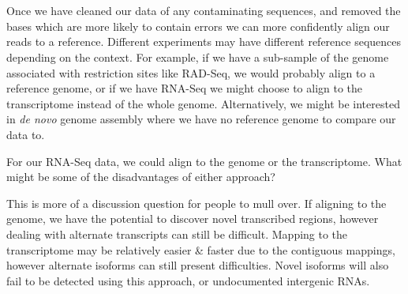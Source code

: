 
\chapter{\moduleTitle}
\newpage


\begin{note}
Once we have cleaned our data of any contaminating sequences, and removed the bases which are more likely to contain errors we can more confidently align our reads to a reference.
Different experiments may have different reference sequences depending on the context.
For example, if we have a sub-sample of the genome associated with restriction sites like RAD-Seq, we would probably align to a reference genome, or if we have RNA-Seq we might choose to align to the transcriptome instead of the whole genome.
Alternatively, we might be interested in \textit{de novo} genome assembly where we have no reference genome to compare our data to.
\end{note}

\begin{questions}
For our RNA-Seq data, we could align to the genome or the transcriptome.
What might be some of the disadvantages of either approach? \\
\begin{answer}
This is more of a discussion question for people to mull over.
If aligning to the genome, we have the potential to discover novel transcribed regions, however dealing with alternate transcripts can still be difficult.
Mapping to the transcriptome may be relatively easier \& faster due to the contiguous mappings, however alternate isoforms can still present difficulties.
Novel isoforms will also fail to be detected using this approach, or undocumented intergenic RNAs. \\
\end{answer}
\end{questions}

